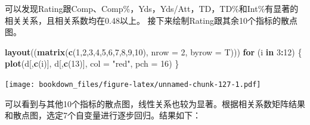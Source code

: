 \documentclass[]{ctexbook}
\newenvironment{Shaded}{\begin{snugshade}}{\end{snugshade}}
\newcommand{\ControlFlowTok}[1]{\textcolor[rgb]{0.13,0.29,0.53}{\textbf{#1}}}
\newcommand{\DataTypeTok}[1]{\textcolor[rgb]{0.13,0.29,0.53}{#1}}
\newcommand{\DecValTok}[1]{\textcolor[rgb]{0.00,0.00,0.81}{#1}}
\newcommand{\KeywordTok}[1]{\textcolor[rgb]{0.13,0.29,0.53}{\textbf{#1}}}
\newcommand{\NormalTok}[1]{#1}
\newcommand{\OperatorTok}[1]{\textcolor[rgb]{0.81,0.36,0.00}{\textbf{#1}}}
\newcommand{\StringTok}[1]{\textcolor[rgb]{0.31,0.60,0.02}{#1}}
\begin{document}
可以发现Rating跟Comp、Comp\%，Yds，Yds/Att，TD，TD\%和Int\%有显著的相关关系，且相关系数均在0.48以上。
接下来绘制Rating跟其余10个指标的散点图。

\begin{Shaded}
\begin{Highlighting}[]
\KeywordTok{layout}\NormalTok{((}\KeywordTok{matrix}\NormalTok{(}\KeywordTok{c}\NormalTok{(}\DecValTok{1}\NormalTok{,}\DecValTok{2}\NormalTok{,}\DecValTok{3}\NormalTok{,}\DecValTok{4}\NormalTok{,}\DecValTok{5}\NormalTok{,}\DecValTok{6}\NormalTok{,}\DecValTok{7}\NormalTok{,}\DecValTok{8}\NormalTok{,}\DecValTok{9}\NormalTok{,}\DecValTok{10}\NormalTok{), }\DataTypeTok{nrow =} \DecValTok{2}\NormalTok{, }\DataTypeTok{byrow =}\NormalTok{ T)))}
\ControlFlowTok{for}\NormalTok{ (i }\ControlFlowTok{in} \DecValTok{3}\OperatorTok{:}\DecValTok{12}\NormalTok{) \{}
  \KeywordTok{plot}\NormalTok{(d[,}\KeywordTok{c}\NormalTok{(i)], d[,}\KeywordTok{c}\NormalTok{(}\DecValTok{13}\NormalTok{)], }\DataTypeTok{col =} \StringTok{"red"}\NormalTok{, }\DataTypeTok{pch =} \DecValTok{16}\NormalTok{)}
\NormalTok{\}}
\end{Highlighting}
\end{Shaded}

\texttt{[image: bookdown\_files/figure-latex/unnamed-chunk-127-1.pdf]}

可以看到与其他10个指标的散点图，线性关系也较为显著。根据相关系数矩阵结果和散点图，选定7个自变量进行逐步回归。结果如下：

\begin{Shaded}
\end{Shaded}
\end{document}
